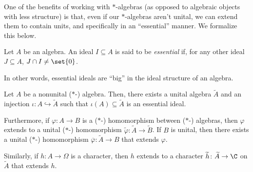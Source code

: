 One of the benefits of working with $\ast$-algebras (as opposed to algebraic objects with less structure) is that, even if our $\ast$-algebras aren't unital, we can extend them to contain units, and specifically in an ``essential'' manner. We formalize this below.
\begin{definition}
  Let $A$ be an algebra. An ideal $I\subseteq A$ is said to be \textit{essential} if, for any other ideal $J\subseteq A$, $J\cap I \neq \set{0}$.
\end{definition}
In other words, essential ideals are ``big'' in the ideal structure of an algebra.
\begin{theorem}
  Let $A$ be a nonunital ($\ast$-) algebra. Then, there exists a unital algebra $\widetilde{A}$ and an injection $\iota\colon A\hookrightarrow \widetilde{A}$ such that $\iota(A)\subseteq \widetilde{A}$ is an essential ideal.\newline

  Furthermore, if $\varphi\colon A\rightarrow B$ is a ($\ast$-) homomorphism between ($\ast$-) algebras, then $\varphi$ extends to a unital ($\ast$-) homomorphism $\widetilde{\varphi}\colon \widetilde{A}\rightarrow \widetilde{B}$. If $B$ is unital, then there exists a unital ($\ast$-) homomorphism $\overline{\varphi}\colon \widetilde{A}\rightarrow B$ that extends $\varphi$.\newline

  Similarly, if $h\colon A\rightarrow \Omega$ is a character, then $h$ extends to a character $\widetilde{h}\colon \widetilde{A}\rightarrow \C$ on $\widetilde{A}$ that extends $h$.
\end{theorem}
